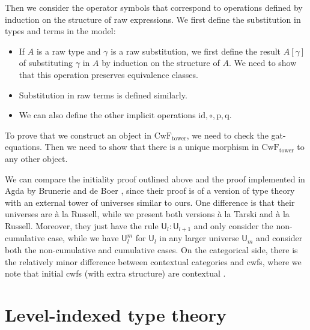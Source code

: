 \documentclass[submission,copyright,creativecommons]{eptcs}
\newcommand{\id}{\mathsf{id}}
\newcommand{\UU}{\mathsf{U}}
\def\UU{\mathsf{U}}
\def\id{\mathrm{id}}
\def\p{\mathrm{p}}
\def\q{\mathrm{q}}
\def\CwFext{\mathrm{CwF_{tower}}}
\begin{document}
Then we consider the operator symbols that correspond to operations defined by induction on the structure of raw expressions. We first define the substitution in types and terms in the model:
\begin{itemize}
\item If $A$ is a raw type and $\gamma$ is a raw substitution, we first define the result $A[\gamma]$ of substituting $\gamma$ in $A$ by induction on the structure of $A$. We need to show that this operation preserves equivalence classes.
\item Substitution in raw terms is defined similarly.
\item We can also define the other implicit operations $\id, \circ, \p, \q$.
\end{itemize}
To prove that we construct an object in $\CwFext$, we need to check the gat-equations. Then we need to show that there is a unique morphism in $\CwFext$ to any other object.

We can compare the initiality proof outlined above and the proof implemented in Agda by Brunerie and de Boer \cite{Brunerie:initiality,deBoer:lic}, since their proof is of a version of type theory with an external tower of universes similar to ours. One difference is that their universes are \`a la Russell, while we present both versions \`a la Tarski and \`a la Russell. Moreover, they just have the rule $\UU_l : \UU_{l+1}$ and only consider the non-cumulative case, while we have $\UU_l^m$ for $\UU_l$ in any larger universe $\UU_m$ and consider both the non-cumulative and cumulative cases. On the categorical side, there is the relatively minor difference between contextual categories and cwfs, where we note that initial cwfs (with extra structure) are contextual \cite{ClairambaultD14,castellan:lambek}.

\section{Level-indexed type theory}\label{level-indexed-tt}
\end{document}
